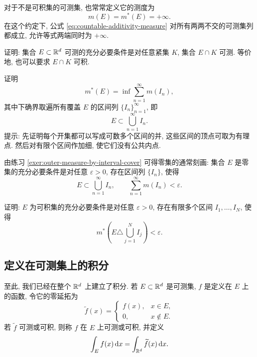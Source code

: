 \begin{rem}
	对于不是可积集的可测集, 也常常定义它的测度为
	\[
	m(E)=m^*(E)=+\infty.
	\]
	在这个约定下, 公式 \eqref{eq:countable-additivity-measure} 对所有两两不交的可测集列都成立, 允许等式两端同时为 \(+\infty\).
\end{rem}

\begin{exer}\label{exer:measurable-by-compact-intersections}
	证明: 集合 \(E\subset\mathbb{R}^d\) 可测的充分必要条件是对任意紧集 \(K\), 集合 \(E\cap K\) 可测. 等价地, 也可以要求 \(E\cap K\) 可积.
\end{exer}

\begin{exer}\label{exer:outer-measure-by-interval-cover}
	证明
	\[
	m^*(E)=\inf\sum_{n=1}^{\infty}m(I_n),
	\]
	其中下确界取遍所有覆盖 \(E\) 的区间列 \(\{I_n\}_{n=1}^{\infty}\), 即
	\[
	E\subset\bigcup_{n=1}^{\infty}I_n.
	\]
	提示: 先证明每个开集都可以写成可数多个区间的并, 这些区间的顶点可取为有理点. 然后对有限个区间作加细, 使它们没有公共内点.
\end{exer}

\begin{rem}
	由练习 \ref{exer:outer-measure-by-interval-cover} 可得零集的通常刻画: 集合 \(E\) 是零集的充分必要条件是对任意 \(\varepsilon>0\), 存在区间列 \(\{I_n\}\), 使得
	\[
	E\subset\bigcup_{n=1}^{\infty}I_n,
	\qquad
	\sum_{n=1}^{\infty}m(I_n)<\varepsilon.
	\]
\end{rem}

\begin{exer}\label{exer:integrable-set-finite-interval-approx}
	证明: \(E\) 为可积集的充分必要条件是对任意 \(\varepsilon>0\), 存在有限多个区间 \(I_1,\ldots,I_N\), 使得
	\[
	m^*\left(E\triangle\bigcup_{j=1}^N I_j\right)<\varepsilon.
	\]
\end{exer}

\subsection{定义在可测集上的积分}

至此, 我们已经在整个 \(\mathbb{R}^d\) 上建立了积分. 若 \(E\subset\mathbb{R}^d\) 是可测集, \(f\) 是定义在 \(E\) 上的函数, 令它的零延拓为
\[
\widetilde f(x)=
\begin{cases}
	f(x), & x\in E,\\
	0, & x\notin E.
\end{cases}
\]
若 \(\widetilde f\) 可测或可积, 则称 \(f\) 在 \(E\) 上可测或可积, 并定义
\[
\int_E f(x)\,\dd x
=
\int_{\mathbb{R}^d}\widetilde f(x)\,\dd x.
\]

